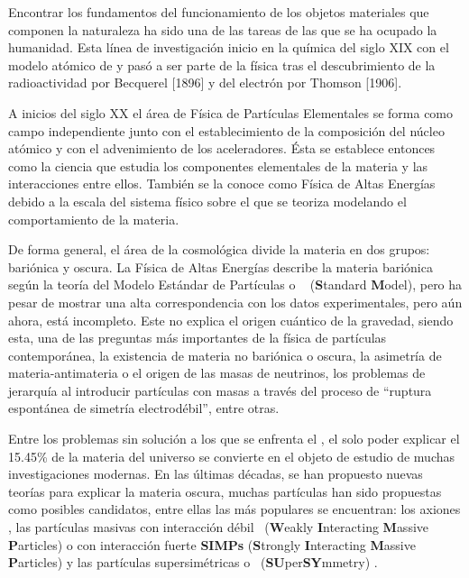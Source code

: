 Encontrar los fundamentos del funcionamiento de los objetos materiales que componen la naturaleza ha sido una de las tareas de las que se ha ocupado la humanidad. Esta línea de investigación inicio en la química del siglo XIX con el modelo atómico de \citet{dalton} y pasó a ser parte de la física tras el descubrimiento de la radioactividad por %
Becquerel [1896] y del electrón por Thomson [1906].

A inicios del siglo XX el área de Física de Partículas Elementales se forma como campo independiente junto con el establecimiento de la composición del núcleo atómico y con el advenimiento de los aceleradores. Ésta se establece entonces como la ciencia que estudia los componentes elementales de la materia y las interacciones entre ellos. También se la conoce como Física de Altas Energías debido a la escala del sistema físico sobre el que se teoriza modelando el comportamiento de la materia.

De forma general, el área de la cosmológica divide la materia en dos grupos: bariónica y oscura. La Física de Altas Energías describe la materia bariónica según la teoría del Modelo Estándar de Partículas o \ME ~ (\textbf{S}tandard \textbf{M}odel), pero ha pesar de mostrar una alta correspondencia con los datos experimentales, pero aún ahora, está incompleto. Este no explica el origen cuántico de la gravedad, siendo esta, una de las preguntas más importantes de la física de partículas contemporánea, la existencia de materia no bariónica o oscura, la asimetría de materia-antimateria o el origen de las masas de neutrinos, los problemas de jerarquía al introducir partículas con masas a través del proceso de ``ruptura espontánea de simetría electrodébil'', entre otras. 


Entre los problemas sin solución a los que se enfrenta el \ME, el solo poder explicar el 15.45\% de la materia del universo se convierte en el objeto de estudio de muchas investigaciones modernas. En las últimas décadas, se han propuesto nuevas teorías para explicar la materia oscura, muchas partículas han sido propuestas como posibles candidatos, entre ellas las más populares se encuentran: los axiones \citep{axion_2019}, las partículas masivas con interacción  débil \WIMPs ~(\textbf{W}eakly \textbf{I}nteracting \textbf{M}assive \textbf{P}articles) \citep{wimps_2018} o con interacción fuerte \textbf{SIMPs} (\textbf{S}trongly \textbf{I}nteracting \textbf{M}assive \textbf{P}articles) \citep{simps_2019} y las partículas supersimétricas o \SUSY~(\textbf{SU}per\textbf{SY}mmetry) \citep{susy_2020}. 

